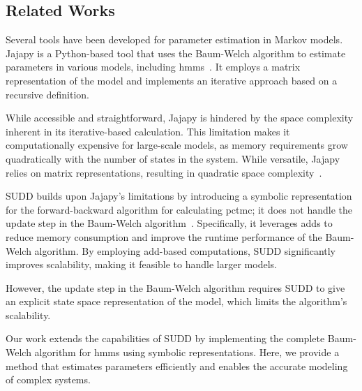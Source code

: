 \subsection{Related Works}\label{subsec:related-works}
Several tools have been developed for parameter estimation in Markov models. 
Jajapy is a Python-based tool that uses the Baum-Welch algorithm to estimate parameters in various models, including \glspl{hmm}~\cite{reynouard2023jajapy}. 
It employs a matrix representation of the model and implements an iterative approach based on a recursive definition.

While accessible and straightforward, Jajapy is hindered by the space complexity inherent in its iterative-based calculation.
This limitation makes it computationally expensive for large-scale models, as memory requirements grow quadratically with the number of states in the system.
While versatile, Jajapy relies on matrix representations, resulting in quadratic space complexity~\cite{davis2004comparing}.

SUDD builds upon Jajapy's limitations by introducing a symbolic representation for the forward-backward algorithm for calculating \gls{pctmc}; it does not handle the update step in the Baum-Welch algorithm~\cite{p7}.
Specifically, it leverages \glspl{add} to reduce memory consumption and improve the runtime performance of the Baum-Welch algorithm.
By employing \gls{add}-based computations, SUDD significantly improves scalability, making it feasible to handle larger models.

However, the update step in the Baum-Welch algorithm requires SUDD to give an explicit state space representation of the model, which limits the algorithm's scalability.

Our work extends the capabilities of SUDD by implementing the complete Baum-Welch algorithm for \glspl{hmm} using symbolic representations.
Here, we provide a method that estimates parameters efficiently and enables the accurate modeling of complex systems.




